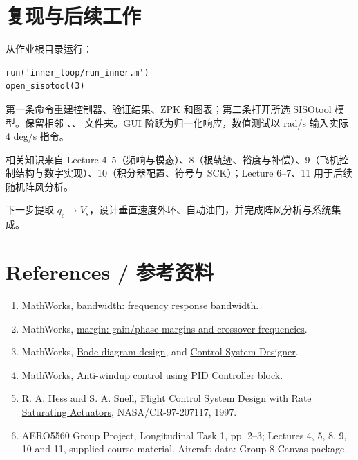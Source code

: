 \documentclass[UTF8,a4paper,11pt,fontset=windows]{ctexart}
\newcommand{\file}[1]{\texttt{\detokenize{#1}}}
\begin{document}
\section{复现与后续工作}
从作业根目录运行：
\begin{verbatim}
run('inner_loop/run_inner.m')
open_sisotool(3)
\end{verbatim}
第一条命令重建控制器、验证结果、ZPK 和图表；第二条打开所选 SISOtool 模型。保留相邻 \file{Gqde}、\file{A_B_Matrix}、\file{trim} 文件夹。GUI 阶跃为归一化响应，数值测试以 rad/s 输入实际 4 deg/s 指令。

相关知识来自 Lecture 4--5（频响与模态）、8（根轨迹、裕度与补偿）、9（飞机控制结构与数字实现）、10（积分器配置、符号与 SCK）；Lecture 6--7、11 用于后续随机阵风分析。

下一步提取 $q_c\rightarrow V_s$，设计垂直速度外环、自动油门，并完成阵风分析与系统集成。

\section*{References / 参考资料}
\begin{enumerate}
\item MathWorks, \href{https://www.mathworks.com/help/control/ref/dynamicsystem.bandwidth.html}{bandwidth: frequency response bandwidth}.
\item MathWorks, \href{https://www.mathworks.com/help/control/ref/dynamicsystem.margin.html}{margin: gain/phase margins and crossover frequencies}.
\item MathWorks, \href{https://www.mathworks.com/help/control/ug/bode-diagram-design.html}{Bode diagram design}, and \href{https://www.mathworks.com/help/control/ref/controlsystemdesigner-app.html}{Control System Designer}.
\item MathWorks, \href{https://www.mathworks.com/help/simulink/slref/anti-windup-control-using-a-pid-controller.html}{Anti-windup control using PID Controller block}.
\item R. A. Hess and S. A. Snell, \href{https://ntrs.nasa.gov/citations/19980017538}{Flight Control System Design with Rate Saturating Actuators}, NASA/CR-97-207117, 1997.
\item AERO5560 Group Project, Longitudinal Task 1, pp. 2--3; Lectures 4, 5, 8, 9, 10 and 11, supplied course material. Aircraft data: Group 8 Canvas package.
\end{enumerate}
\end{document}
